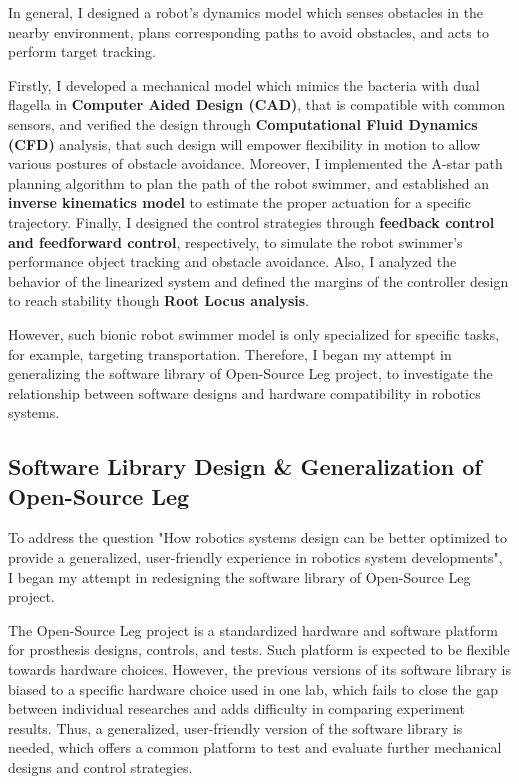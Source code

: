 \documentclass[8pt]{article}
\begin{document}
    In general, I designed a robot's dynamics model which senses obstacles in the nearby environment, plans corresponding paths to avoid obstacles, and acts to perform target tracking. 

    Firstly, I developed a mechanical model which mimics the bacteria with dual flagella in \textbf{Computer Aided Design (CAD)}, that is compatible with common sensors, and verified the design through \textbf{Computational Fluid Dynamics (CFD)} analysis, that such design will empower flexibility in motion to allow various postures of obstacle avoidance. Moreover, I implemented the A-star\cite{AstarAlgo} path planning algorithm to plan the path of the robot swimmer, and established an \textbf{inverse kinematics model} to estimate the proper actuation for a specific trajectory. Finally, I designed the control strategies through \textbf{feedback control and feedforward control}, respectively, to simulate the robot swimmer's performance object tracking and obstacle avoidance. Also, I analyzed the behavior of the linearized system and defined the margins of the controller design to reach stability though \textbf{Root Locus analysis}\cite{RootLocus}.

    However, such bionic robot swimmer model is only specialized for specific tasks, for example, targeting transportation. Therefore, I began my attempt in generalizing the software library of Open-Source Leg project, to investigate the relationship between software designs and hardware compatibility in robotics systems.

    \subsection{Software Library Design \& Generalization of Open-Source Leg}   \label{sec:OSL-Library}

    To address the question "How robotics systems design can be better optimized to provide a generalized, user-friendly experience in robotics system developments", I began my attempt in redesigning the software library of Open-Source Leg project.
    
    The Open-Source Leg project is a standardized hardware and software platform for prosthesis designs, controls, and tests. Such platform is expected to be flexible towards hardware choices. However, the previous versions of its software library is biased to a specific hardware choice used in one lab, which fails to close the gap between individual researches and adds difficulty in comparing experiment results. Thus, a generalized, user-friendly version of the software library is needed, which offers a common platform to test and evaluate further mechanical designs and control strategies. 
\end{document}
